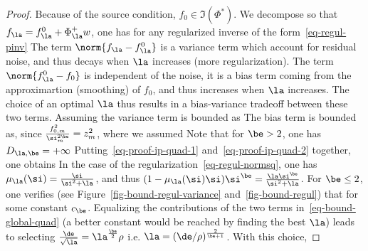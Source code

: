 \begin{proof}
	Because of the source condition, $f_0 \in \Im(\Phi^*)$. 
	We decompose
	so that $f_\la = f_{\la}^0 + \Phi_\la^+ w$, one has for any regularized inverse of the form~\eqref{eq-regul-pinv} 
	The term $\norm{ f_\la - f_{\la}^0 }$ is a variance term which account for residual noise, and thus decays when $\la$ increases (more regularization).
	The term $\norm{ f_{\la}^0 - f_0 }$ is independent of the noise, it is a bias term coming from the approximartion (smoothing) of $f_0$, and thus increases when $\la$ increases. The choice of an optimal $\la$ thus results in a bias-variance tradeoff between these two terms.
	Assuming 
	the variance term is bounded as
	The bias term is bounded as, since $\frac{f_{0,m}^2}{\si_m^{2\be}} = z_m^2$, 
	where we assumed
	Note that for $\be>2$, one has $D_{\la,\be}=+\infty$
	Putting~\eqref{eq-proof-ip-quad-1} and~\eqref{eq-proof-ip-quad-2} together, one obtains
	In the case of the regularization~\eqref{eq-regul-normsq}, one has $\mu_\la(\si) = \frac{\si}{\si^2+\la}$, and
	thus $( 1 - \mu_\la(\si) \si )\si^{\be} = \frac{\la \si^\be}{\si^2+\la}$. 
	For $\be \leq 2$, one verifies (see Figure~\ref{fig-bound-regul-variance} and~\ref{fig-bound-regul}) that 
	for some constant $c_\be$.
	Equalizing the contributions of the two terms in~\eqref{eq-bound-global-quad} (a better constant would be reached by finding the best $\la$) leads to selecting $\frac{\de}{\sqrt{\la}} = \la^{\frac{\be}{2}} \rho$ i.e. $\la = (\de/\rho)^{\frac{2}{\be+1}}$. With this choice, 
\end{proof}



